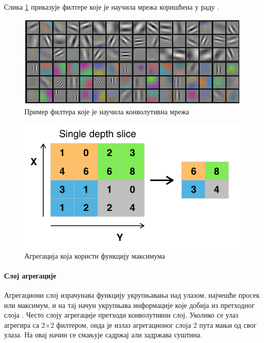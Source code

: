 \documentclass[a4paper]{article}
\begin{document}
Слика \ref{fig:filters} приказује филтере које је научила мрежа коришћена у раду \cite{krizhevsky}.

\begin{figure}[h!]
\begin{center}
    \includegraphics[width=\textwidth]{./resources/filters}
\end{center}
\caption{Пример филтера које је научила конволутивна мрежа}
\label{fig:filters}
\end{figure}

\begin{figure}[h!]
\begin{center}
    \includegraphics[scale=0.3]{./resources/maxpooling.png}
\end{center}
\caption{Агрегација која користи функцију максимума}
\label{fig:maxpooling}
\end{figure}

\paragraph{Слој агрегације}
Агрегациони слој израчунава функцију укрупњавања над улазом, најчешће
просек или максимум, и на тај начун укрупњава информације које добија
из претходног слоја \cite{ni}. Често слоју агрегације претходи конволутивни слој.
Уколико се улаз агрегира са 2$\times$2 филтером, онда је излаз агрегационог
слоја 2 пута мањи од свог улаза. На овај начин се смањује садржај али задржава
суштина.
\end{document}
